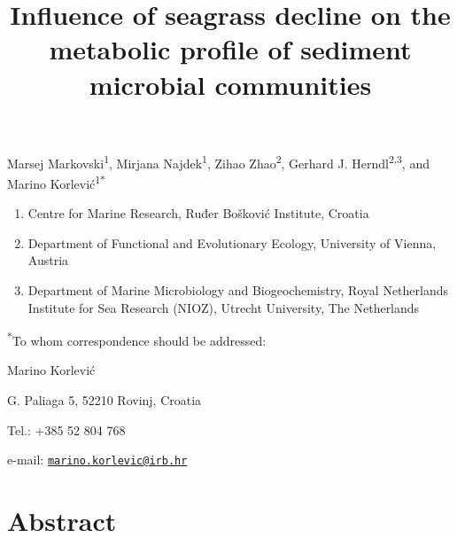 \documentclass[
  12 pt,
]{article}
\title{\textbf{Influence of seagrass decline on the metabolic profile of sediment microbial communities}}
\author{}
\date{\vspace{-2.5em}}
\begin{document}
\maketitle


\renewcommand{\figurename}{Fig.}
\renewcommand{\thefigure}{\arabic{figure}}

\vspace{\fill}

Marsej Markovski\textsuperscript{1}, Mirjana Najdek\textsuperscript{1}, Zihao Zhao\textsuperscript{2}, Gerhard J. Herndl\textsuperscript{2,3}, and Marino Korlević\textsuperscript{1*}

\begin{enumerate}
\def\labelenumi{\arabic{enumi}.}
\item
  Centre for Marine Research, Ruđer Bošković Institute, Croatia
\item
  Department of Functional and Evolutionary Ecology, University of Vienna, Austria
\item
  Department of Marine Microbiology and Biogeochemistry, Royal Netherlands Institute for Sea Research (NIOZ), Utrecht University, The Netherlands
\end{enumerate}

\textsuperscript{*}To whom correspondence should be addressed:

Marino Korlević

G. Paliaga 5, 52210 Rovinj, Croatia

Tel.: +385 52 804 768

e-mail: \href{mailto:marino.korlevic@irb.hr}{\nolinkurl{marino.korlevic@irb.hr}}

\linenumbers
{}
\setlength\parindent{24pt}
\newpage

\hypertarget{abstract}{%
\section{Abstract}\label{abstract}}
\end{document}
